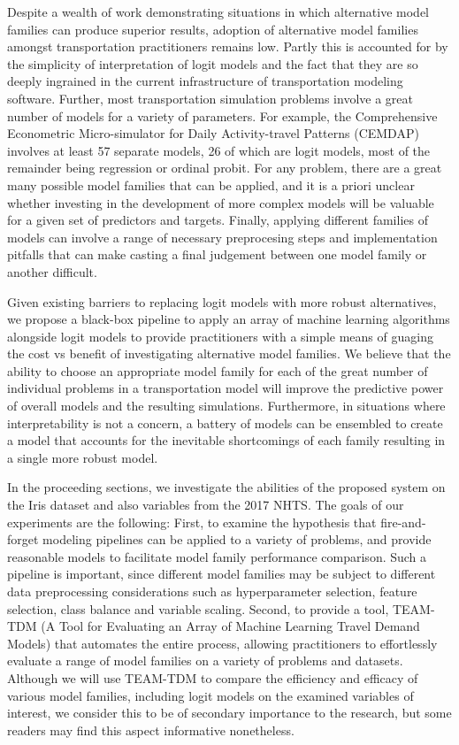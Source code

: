 \documentclass[conference]{IEEEtran}
\begin{document}
Despite a wealth of work demonstrating situations in which alternative model families can produce superior results, adoption of alternative model families amongst transportation practitioners remains low.
 Partly this is accounted for by the simplicity of interpretation of logit models and the fact that they are so deeply ingrained in the current infrastructure of transportation modeling software.
 Further, most transportation simulation problems involve a great number of models for a variety of parameters.
 For example, the Comprehensive Econometric Micro-simulator for Daily Activity-travel Patterns (CEMDAP) \cite{pinjari2008cemdap} involves at least 57 separate models, 26 of which are logit models, most of the remainder being regression or ordinal probit.
 For any problem, there are a great many possible model families that can be applied, and it is a priori unclear whether investing in the development of more complex models will be valuable for a given set of predictors and targets.
 Finally, applying different families of models can involve a range of necessary preprocesing steps and implementation pitfalls that can make casting a final judgement between one model family or another difficult.
 
Given existing barriers to replacing logit models with more robust alternatives, we propose a black-box pipeline to apply an array of machine learning algorithms alongside logit models to provide practitioners with a simple means of guaging the cost vs benefit of investigating alternative model families.
 We believe that the ability to choose an appropriate model family for each of the great number of individual problems in a transportation model will improve the predictive power of overall models and the resulting simulations.
 Furthermore, in situations where interpretability is not a concern, a battery of models can be ensembled to create a model that accounts for the inevitable shortcomings of each family resulting in a single more robust model.

In the proceeding sections, we investigate the abilities of the proposed system on the Iris dataset and also variables from the 2017 NHTS.
 The goals of our experiments are the following:
 First, to examine the hypothesis that fire-and-forget modeling pipelines can be applied to a variety of problems, and provide reasonable models to facilitate model family performance comparison.
 Such a pipeline is important, since different model families may be subject to different data preprocessing considerations such as hyperparameter selection, feature selection, class balance and variable scaling.
 Second, to provide a tool, TEAM-TDM (A Tool for Evaluating an Array of Machine Learning Travel Demand Models) that automates the entire process, allowing practitioners to effortlessly evaluate a range of model families on a variety of problems and datasets.
 Although we will use TEAM-TDM to compare the efficiency and efficacy of various model families, including logit models on the examined variables of interest, we consider this to be of secondary importance to the research, but some readers may find this aspect informative nonetheless.
 
\end{document}
